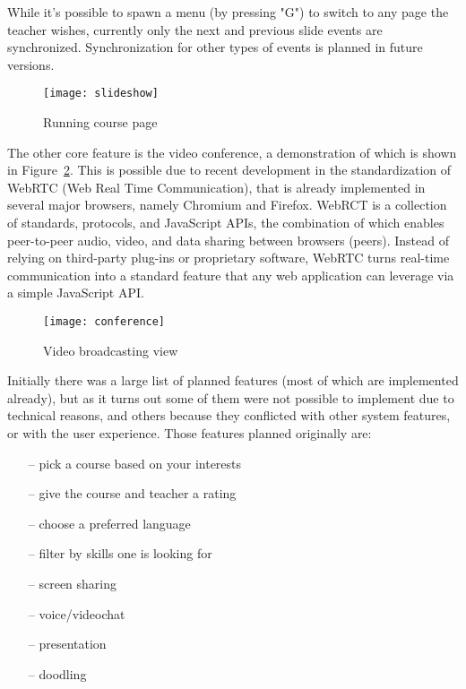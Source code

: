 While it's possible to spawn a menu (by
pressing "G") to switch to any page the teacher wishes, currently only the
next and previous slide events are synchronized. Synchronization for other types
of events is planned in future versions.
\begin{figure}[ht!]
\centering
\texttt{[image: slideshow]}
\caption{Running course page}
\label{fig:slideshow}
\end{figure}
The other core feature is the video conference, a demonstration of which is shown in Figure~\ref{fig:conference}.
This is possible due to recent development in
the standardization of WebRTC (Web Real Time Communication), that is already
implemented in several major browsers, namely Chromium and Firefox.  WebRCT is a
collection of standards, protocols, and JavaScript APIs, the combination of
which enables peer-to-peer audio, video, and data sharing between browsers
(peers). Instead of relying on third-party plug-ins or proprietary software,
WebRTC turns real-time communication into a standard feature that any web
application can leverage via a simple JavaScript API.
\begin{figure}[ht!]
\centering
\texttt{[image: conference]}
\caption{Video broadcasting view}
\label{fig:conference}
\end{figure}

Initially there was a large list of planned features (most of which are implemented already), but as it
turns out some of them were not possible to implement due to technical reasons, and others because they
conflicted with other system features, or with the user experience. Those features planned originally are:
\begin{enumerate}[topsep=5pt, partopsep=0pt,itemsep=3pt,parsep=1pt]
    \item[--] pick a course based on your interests
    \item[--] give the course and teacher a rating
    \item[--] choose a preferred language
    \item[--] filter by skills one is looking for
    \item[--] screen sharing
    \item[--] voice/videochat
    \item[--] presentation
    \item[--] doodling
\end{enumerate}

